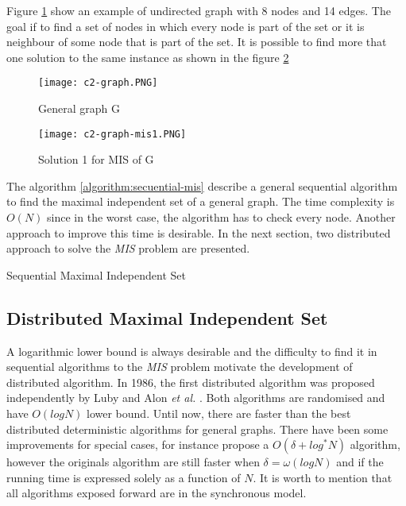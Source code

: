 Figure \ref{fig:graph1} show an example of undirected graph with 8 nodes and 14 edges. The goal if to find a set of nodes in which every node is part of the set or it is neighbour of some node that is part of the set. It is possible to find more that one solution to the same instance as shown in the figure \ref{fig:mis1}  
 
\begin{figure}[h]
\texttt{[image: c2-graph.PNG]} 
\caption{General graph G}
\label{fig:graph1}
\end{figure}
 
\begin{figure}[h]
\texttt{[image: c2-graph-mis1.PNG]}
\caption{Solution 1 for MIS of G}
\label{fig:mis1}
\end{figure}

The algorithm \ref{algorithm:secuential-mis} describe a general sequential algorithm to find the maximal independent set of a general graph. The time complexity is $O(N)$ since in the worst case, the algorithm has to check every node. Another approach to improve this time is desirable. In the next section, two distributed approach to solve the \textit{MIS} problem are presented.

\begin{algorithm}
 \caption{Sequential Maximal Independent Set}
 \label{algorithm:secuential-mis} 

\SetAlgoLined
{}
    
 
\end{algorithm}
 

 
\subsection{Distributed Maximal Independent Set}

A logarithmic lower bound is always desirable and the difficulty to find it in sequential algorithms to the \textit{MIS} problem motivate the development of distributed algorithm. In 1986, the first distributed algorithm was proposed independently by Luby \cite{luby1986simple} and Alon \textit{et al.} \cite{alon1986fast}. Both algorithms are randomised and have $O(log N)$ lower bound. Until now, there are faster than the best distributed deterministic algorithms for general graphs. There have been some improvements for special cases, for instance \cite{panconesi1996complexity} propose a $O(\delta + log^* N)$ algorithm, however  the originals algorithm are still faster when $\delta = \omega(log N)$ and if the running time is expressed solely as a function of $N$. It is worth to mention that all algorithms exposed forward are in the synchronous model. 

